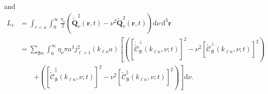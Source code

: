 \documentclass{article}
\begin{document}
and
\begin{equation}
\begin{split}
L_r &= \int_{r<a}\int_0^\infty\frac{\eta_\nu}{2}\left(\dot{\tilde{\mathbf{Q}}}_\nu^2(\mathbf{r},t) - \nu^2\tilde{\mathbf{Q}}_\nu^2(\mathbf{r},t)\right)\mathrm{d}\nu\,\mathrm{d}^3\mathbf{r}\\
&= \sum_{\bm{\beta}n}\int_0^\infty\eta_\nu\pi a^3j_{\ell + 1}^2(k_{\ell n}a)\left[\left(\left[\dot{\tilde{\mathcal{C}}}_{\bm{\beta}}^\perp(k_{\ell n},\nu;t)\right]^2 - \nu^2\left[\tilde{\mathcal{C}}_{\bm{\beta}}^\perp(k_{\ell n},\nu;t)\right]^2\right)\right.\\
&\qquad\left. + \left(\left[\dot{\tilde{\mathcal{C}}}_{\bm{\beta}}^\parallel(k_{\ell n},\nu;t)\right]^2 - \nu^2\left[\tilde{\mathcal{C}}_{\bm{\beta}}^\parallel(k_{\ell n},\nu;t)\right]^2\right)\right]\mathrm{d}\nu.
\end{split}
\end{equation}
\end{document}
